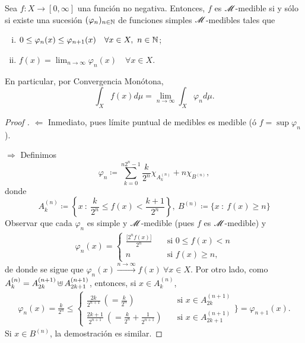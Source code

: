 \begin{lemma}
	Sea $f: X \to [0,\infty]$ una función no negativa. Entonces, $f$ es $\mathscr{M}$-medible si y sólo si existe una sucesión $(\varphi_{n})_{n\in\mathbb{N}}$ de funciones simples $\mathscr{M}$-medibles tales que
	\begin{enumerate}[i)]
		\item $0 \leq \varphi_{n}(x) \leq \varphi_{n+1}(x) \quad \forall x \in X,\ n \in \mathbb{N}$;

		\item $f(x) = \lim_{n \to \infty} \varphi_{n}(x) \quad \forall x \in X$.
	\end{enumerate}
	En particular, por Convergencia Monótona,
	\[ \int_{X} f(x) d\mu = \lim_{n \to \infty} \int_{X} \varphi_{n} d\mu. \]
\end{lemma}
\begin{proof}[Proof ]
	$\boxed{\Leftarrow}$ Inmediato, pues límite puntual de medibles es medible (ó $f = \sup \varphi_{n}$). \par
	\medskip
	$\boxed{\Rightarrow}$ Definimos
	\[ \varphi_{n} \coloneq \sum_{k=0}^{n 2^{n} - 1} \frac{k}{2^{n}} \chi_{A_{k}^{(n)}} + n \chi_{B^{(n)}}, \]
	donde 
	\[ A_{k}^{(n)} \coloneq \left\{x \ : \ \frac{k}{2^{n}} \leq f(x) < \frac{k+1}{2^{n}}\right\},\ B^{(n)} \coloneq \{x \ : \ f(x) \geq n\} \]
	Observar que cada $\varphi_{n}$ es simple y $\mathscr{M}$-medible (pues $f$ es $\mathscr{M}$-medible) y
	\begin{align*}
		\varphi_{n}(x) = \begin{cases}
			\frac{\big[2^{n} f(x)\big]}{2^{n}} & \quad \text{si } 0 \leq f(x) < n \\
			n & \quad \text{si } f(x) \geq n,
		\end{cases}
	\end{align*}
	de donde se sigue que $\varphi_{n}(x) \stackrel{n \to \infty}{\longrightarrow} f(x) \ \forall x \in X$. Por otro lado, como $A_{k}^{(n)} = A_{2k}^{(n+1)} \cupd A_{2k+1}^{(n+1)}$, entonces, si $x \in A_{k}^{(n)}$,
	\begin{align*}
		\varphi_{n}(x) = \frac{k}{2^{n}} \leq \begin{cases}
			\frac{2k}{2^{n+1}} \ \left( =\frac{k}{2^{n}} \right) & \quad \text{si } x \in A_{2k}^{(n+1)} \\
			\frac{2k+1}{2^{n+1}} \ \left( =\frac{k}{2^{n}} + \frac{1}{2^{n+1}} \right) & \quad \text{si } x \in A_{2k+1}^{(n+1)}
		\end{cases} \Biggl\} = \varphi_{n+1}(x).
	\end{align*}
	Si $x \in B^{(n)}$, la demostración es similar.
\end{proof}

